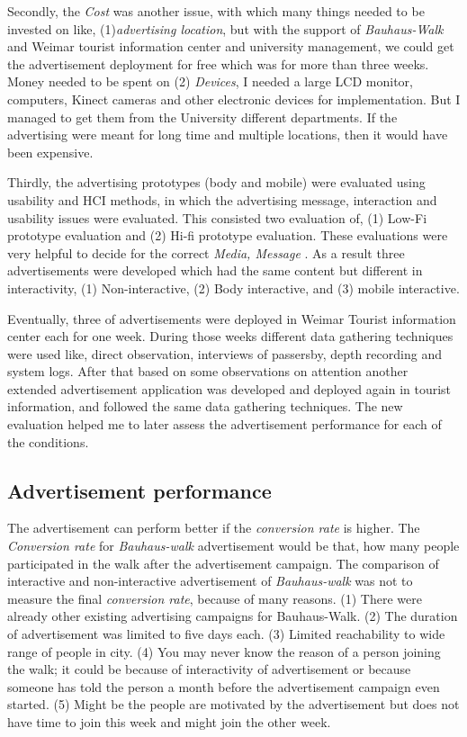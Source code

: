 Secondly, the \emph{Cost} was another issue, with which many things needed to be invested on like, (1)\emph{advertising location}, but with the support of \emph{Bauhaus-Walk} and Weimar tourist information center and university management, we could get the advertisement deployment for free which was for more than three weeks. Money needed to be spent on (2) \emph{Devices}, I needed a large LCD monitor, computers, Kinect cameras and other electronic devices for implementation. But I managed to get them from the University different departments. If the advertising were meant for long time and multiple locations, then it would have been expensive. 

Thirdly, the advertising prototypes (body and mobile) were evaluated using usability and HCI methods, in which the advertising message, interaction and usability issues were evaluated. This consisted two evaluation of, (1) Low-Fi prototype evaluation and (2) Hi-fi prototype evaluation. These evaluations were very helpful to decide for the correct \emph{Media, Message }. As a result three advertisements were developed which had the same content but different in interactivity, (1) Non-interactive, (2) Body interactive, and (3) mobile interactive.

Eventually, three of advertisements were deployed in Weimar Tourist information center each for one week. During those weeks different data gathering techniques were used like, direct observation, interviews of passersby, depth recording and system logs. After that based on some observations on attention another extended advertisement application was developed and deployed again in tourist information, and followed the same data gathering techniques.  The new evaluation helped me to later assess the advertisement performance for each of the conditions.


\subsection{Advertisement performance}
The advertisement can perform better if the \emph{conversion rate} is higher. The \emph{Conversion rate} for \emph{Bauhaus-walk} advertisement would be that, how many people participated in the walk after the advertisement campaign. The comparison of interactive and non-interactive advertisement of \emph{Bauhaus-walk} was not to measure the final \emph{conversion rate}, because of many reasons. (1) There were already other existing advertising campaigns for Bauhaus-Walk. (2) The duration of advertisement was limited to five days each. (3) Limited reachability to wide range of people in city. (4) You may never know the reason of a person joining the walk; it could be because of interactivity of advertisement or because someone has told the person a month before the advertisement campaign even started. (5) Might be the people are motivated by the advertisement but does not have time to join this week and might join the other week.

